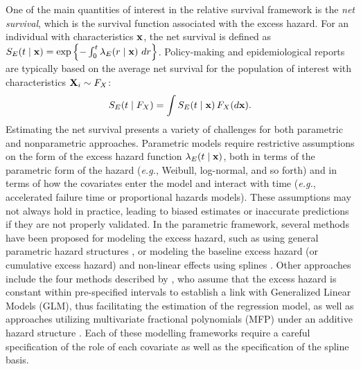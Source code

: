 \documentclass[12pt]{article}
\newcommand{\bfX}{{\bf X}}
\newcommand{\bfx}{{\bf x}}
\begin{document}
One of the main quantities of interest in the relative survival framework is the \emph{net survival}, which is the survival function associated with the excess hazard. For an individual with characteristics $\bfx$, the net survival is defined as $S_E(t \mid \bfx) = \exp\left\{-\int_0^t \lambda_E( r \mid \bfx) \  dr\right\}$. Policy-making and epidemiological reports \citep{mariotto:2014,quaresma:2024} are typically based on the average net survival for the population of interest with characteristics $\bfX_i \sim F_X$:
\begin{equation*}
 S_E(t \mid F_X) = \int S_E(t \mid \bfx) \, F_X(d\bfx).
\end{equation*}
Estimating the net survival presents a variety of challenges for both parametric and nonparametric approaches. Parametric models require restrictive assumptions on the form of the excess hazard function $\lambda_E(t \mid \bfx)$, both in terms of the parametric form of the hazard (\textit{e.g.}, Weibull, log-normal, and so forth) and in terms of how the covariates enter the model and interact with time (\textit{e.g.}, accelerated failure time or proportional hazards models). These assumptions may not always hold in practice, leading to biased estimates or inaccurate predictions if they are not properly validated. In the parametric framework, several methods have been proposed for modeling the excess hazard, such as using general parametric hazard structures \citep{rubio:2019}, or modeling the baseline excess hazard (or cumulative excess hazard) and non-linear effects using splines \citep{giorgi:2003,dickman:2004,charvat:2021,fauvernier:2019,quaresma:2020,eletti:2022}. Other approaches include the four methods described by \cite{dickman:2004}, who assume that the excess hazard is constant within pre-specified intervals to establish a link with Generalized Linear Models (GLM), thus facilitating the estimation of the regression model, as well as approaches utilizing multivariate fractional polynomials (MFP) under an additive hazard structure \citep{lambert:2005}. Each of these modelling frameworks require a careful specification of the role of each covariate as well as the specification of the spline basis.
\end{document}
